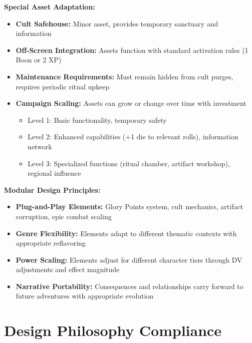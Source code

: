 \documentclass[11pt]{article}
\begin{document}
\begin{itemize}
\textbf{Special Asset Adaptation:}
\begin{itemize}
\item \textbf{Cult Safehouse:} Minor asset, provides temporary sanctuary and information
\item \textbf{Off-Screen Integration:} Assets function with standard activation rules (1 Boon or 2 XP)
\item \textbf{Maintenance Requirements:} Must remain hidden from cult purges, requires periodic ritual upkeep
\item \textbf{Campaign Scaling:} Assets can grow or change over time with investment
  \begin{itemize}
  \item Level 1: Basic functionality, temporary safety
  \item Level 2: Enhanced capabilities (+1 die to relevant rolls), information network
  \item Level 3: Specialized functions (ritual chamber, artifact workshop), regional influence
  \end{itemize}
\end{itemize}

\textbf{Modular Design Principles:}
\begin{itemize}
\item \textbf{Plug-and-Play Elements:} Glory Points system, cult mechanics, artifact corruption, epic combat scaling
\item \textbf{Genre Flexibility:} Elements adapt to different thematic contexts with appropriate reflavoring
\item \textbf{Power Scaling:} Elements adjust for different character tiers through DV adjustments and effect magnitude
\item \textbf{Narrative Portability:} Consequences and relationships carry forward to future adventures with appropriate evolution
\end{itemize}

\section{Design Philosophy Compliance}


\end{itemize}
\end{document}
